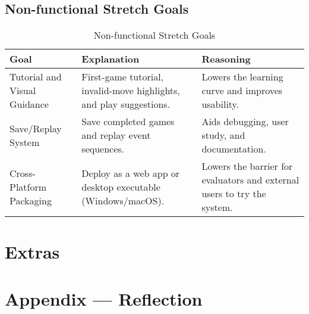 \documentclass{article}
\begin{document}
    \subsection{Non-functional Stretch Goals}
    \begin{table}[H]
        \caption{Non-functional Stretch Goals}\label{TblStretchNonFunctionalGoals}
        \begin{tabular}{|p{}|p{}|p{}|}
            \hline
            \textbf{Goal} & \textbf{Explanation} & \textbf{Reasoning} \\
            \hline
            Tutorial and Visual Guidance &
            First-game tutorial, invalid-move highlights, and play suggestions. &
            Lowers the learning curve and improves usability. \\
            \hline
            Save/Replay System &
            Save completed games and replay event sequences. &
            Aids debugging, user study, and documentation. \\
            \hline
            Cross-Platform Packaging &
            Deploy as a web app or desktop executable (Windows/macOS). &
            Lowers the barrier for evaluators and external users to try the system. \\
            \hline
        \end{tabular}
    \end{table}

    \section{Extras}


    \newpage{}
    \section*{Appendix --- Reflection}
\end{document}
